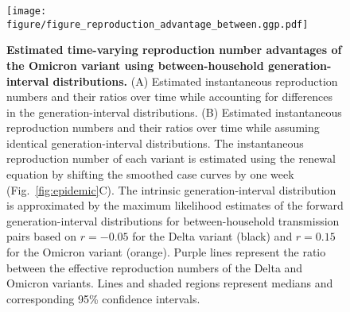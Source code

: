 \documentclass[12pt]{article}
\newcommand{\fref}[1]{Fig.~\ref{fig:#1}}
\begin{document}
\pagebreak

\begin{figure}[!th]
\texttt{[image: figure/figure\_reproduction\_advantage\_between.ggp.pdf]}
\caption{
\textbf{Estimated time-varying reproduction number advantages of the Omicron variant using between-household generation-interval distributions.}
(A) Estimated instantaneous reproduction numbers and their ratios over time while accounting for differences in the generation-interval distributions.
(B) Estimated instantaneous reproduction numbers and their ratios over time while assuming identical generation-interval distributions.
The instantaneous reproduction number of each variant is estimated using the renewal equation by shifting the smoothed case curves by one week (\fref{epidemic}C).
The intrinsic generation-interval distribution is approximated by the maximum likelihood estimates of the forward generation-interval distributions for between-household transmission pairs based on $r=-0.05$ for the Delta variant (black) and $r=0.15$ for the Omicron variant (orange).
Purple lines represent the ratio between the effective reproduction numbers of the Delta and Omicron variants.
Lines and shaded regions represent medians and corresponding 95\% confidence intervals.
}
\end{figure}

\pagebreak


\end{document}

